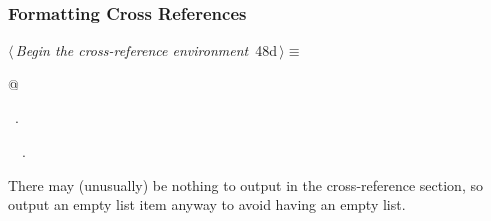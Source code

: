 \documentclass[a4paper]{report}
\begin{document}
\subsubsection{Formatting Cross References}

\begin{flushleft} \small
\begin{minipage}{\linewidth}\label{scrap92}\raggedright\small
{} $\langle\,${\it Begin the cross-reference environment}\nobreak\ {\footnotesize {48d}}$\,\rangle\equiv$
\vspace{-1ex}
\begin{list}{}{} \item
\mbox{}@\\
\mbox{}\verb@@{\NWsep}
\end{list}
\vspace{-1.5ex}
\footnotesize
\begin{list}{}{\setlength{\itemsep}{-\parsep}\setlength{\itemindent}{-\leftmargin}}
\item \NWtxtMacroRefIn\ .
\item \NWtxtIdentsUsed\nobreak\  \verb@fputs@\nobreak\ .
\item{}
\end{list}
\end{minipage}\vspace{4ex}
\end{flushleft}
There may (unusually) be nothing to output in the cross-reference
section, so output an empty list item anyway to avoid having an empty
list.
\end{document}
